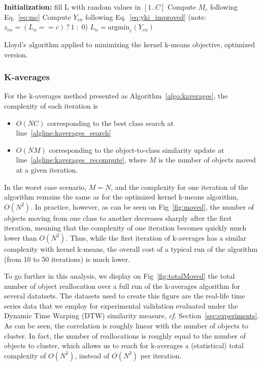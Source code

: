 \documentclass[10pt,letterpaper]{article}
\begin{document}
\begin{algorithm}
	\SetAlgoLined
	\BlankLine
	\textbf{Initialization:}
	fill L with random values in $[1..C]$\;
	\BlankLine
	 {
	     {
	        Compute $M_c$ following Eq.~\ref{eq:mc} \label{algline:kkmeans_imp_mc}
	    }
		 {
			 {
				Compute $Y_{cn}$ following Eq.~\ref{eq:yki_improved} \label{algline:kkmeans_imp_cplx1}
				(note: $z_{cn} = (L_n == c)\,?\,1\;:\;0$)
			}
			$L_n = \textrm{argmin}_c (Y_{cn})$\;
		}
	}
	\BlankLine
	\caption{Lloyd's algorithm applied to minimizing the kernel k-means objective, optimized version.}
  \label{algo:kkmeans_optim}
\end{algorithm}


\subsubsection{K-averages}

For the k-averages method presented as Algorithm~\ref{algo:kaverages}, the complexity of each iteration is
\begin{itemize}
\item $O(NC)$ corresponding to the best class search at line~\ref{algline:kaverages_search}
\item  $O(NM)$ corresponding to the object-to-class similarity update at line~\ref{algline:kaverages_recompute}, where $M$ is the number of objects moved at a given iteration.
\end{itemize}

In the worst case scenario, $M = N$, and the complexity for one iteration of the algorithm remains the same as for the optimized kernel k-means algorithm, $O(N^2)$. In practice, however, as can be seen on Fig~\ref{fig:moved}, the number of objects moving from one class to another decreases sharply after the first iteration, meaning that the complexity of one iteration becomes quickly much lower than $O(N^2)$. Thus, while the first iteration of k-averages has a similar complexity with kernel k-means, the overall cost of a typical run of the algorithm (from 10 to 50 iterations) is much lower.


To go further in this analysis, we display on Fig~\ref{fig:totalMoved}  the total number of object reallocation over a full run of the k-averages algorithm for several datatsets. The datasets used to create this figure are the real-life time series data that we employ for experimental validation evaluated under the Dynamic Time Warping (DTW) similarity measure, \textit{cf.} Section~\ref{sec:experiments}. As can be seen, the correlation is roughly linear with the number of objects to cluster. In fact, the number of reallocations is roughly equal to the number of objects to cluster, which allows us to reach for k-averages a (statistical) total complexity of $O(N^2)$, instead of $O(N^2)$ per iteration.
\end{document}

